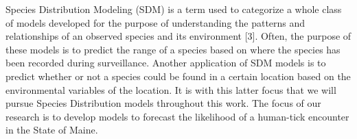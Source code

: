 \noindent Species Distribution Modeling (SDM) is a term used to categorize a whole class of models developed for the purpose of understanding the patterns and relationships of an observed species and its environment [3]. Often, the purpose of these models is to predict the range of a species based on where the species has been recorded during surveillance. Another application of SDM models is to predict whether or not a species could be found in a certain location based on the environmental variables of the location. It is with this latter focus that we will pursue Species Distribution models throughout this work. The focus of our research is to develop models to forecast the likelihood of a human-tick encounter in the State of Maine.  \newline

